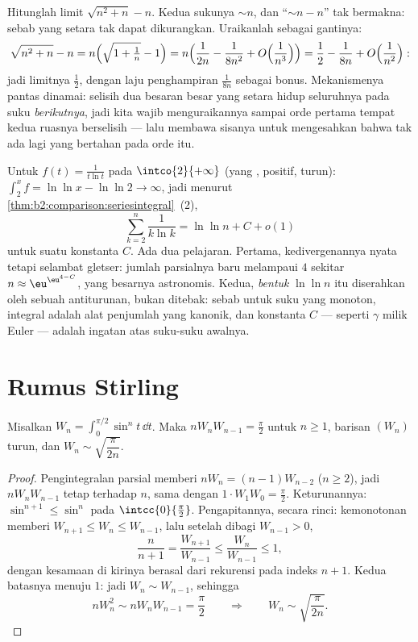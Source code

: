 \begin{example}\label{ex:b2:comparison:cancellation}
Hitunglah limit $\sqrt{n^2 + n} - n$. Kedua sukunya
$\sim n$, dan ``$\sim n - n$'' tak bermakna: sebab yang setara
tak dapat dikurangkan. Uraikanlah sebagai gantinya:
\[
\sqrt{n^2 + n} - n
= n\Bigl(\sqrt{1 + \tfrac1n} - 1\Bigr)
= n\Bigl(\frac{1}{2n} - \frac{1}{8n^2} +
O\Bigl(\frac1{n^3}\Bigr)\Bigr)
= \frac12 - \frac{1}{8n} + O\Bigl(\frac1{n^2}\Bigr) :
\]
jadi limitnya $\frac12$, dengan laju penghampiran $\frac1{8n}$ sebagai
bonus. Mekanismenya pantas dinamai: selisih dua besaran besar
yang setara hidup seluruhnya pada suku \emph{berikutnya},
jadi kita wajib menguraikannya sampai orde pertama tempat kedua
ruasnya berselisih --- lalu membawa sisanya untuk mengesahkan bahwa
tak ada lagi yang bertahan pada orde itu.
\end{example}

\begin{example}\label{ex:b2:comparison:loglog}
Untuk $f(t) = \frac{1}{t\ln t}$ pada $\intco{2}{+\infty}$
(yang , positif, turun): $\int_2^x f = \ln\ln x -
\ln\ln 2 \to \infty$, jadi menurut
\cref{thm:b2:comparison:seriesintegral}~(2),
\[
\sum_{k=2}^{n}\frac{1}{k\ln k} = \ln\ln n + C + o(1)
\]
untuk suatu konstanta $C$. Ada dua pelajaran. Pertama, kedivergenannya
nyata tetapi selambat gletser: jumlah parsialnya baru melampaui $4$
sekitar $n \approx \eu^{\eu^{4 - C}}$, yang besarnya astronomis. Kedua,
\emph{bentuk} $\ln\ln n$ itu diserahkan oleh sebuah antiturunan, bukan
ditebak: sebab untuk suku yang monoton, integral adalah alat penjumlah
yang kanonik, dan konstanta $C$ --- seperti $\gamma$ milik Euler
--- adalah ingatan atas suku-suku awalnya.
\end{example}

\section{Rumus Stirling}

\begin{lemma}\label{lem:b2:comparison:wallis}
Misalkan $W_n = \int_0^{\pi/2} \sin^n t\,\dd t$. Maka $nW_nW_{n-1} =
\frac\pi2$ untuk $n \geq 1$, barisan $(W_n)$ turun, dan $W_n \sim
\sqrt{\dfrac{\pi}{2n}}$.
\end{lemma}

\begin{proof}
Pengintegralan parsial memberi $nW_n = (n-1)W_{n-2}$ ($n \geq 2$), jadi
$nW_nW_{n-1}$ tetap terhadap $n$, sama dengan $1 \cdot W_1 W_0 =
\frac\pi2$. Keturunannya: $\sin^{n+1} \leq \sin^n$ pada
$\intcc{0}{\frac\pi2}$. Pengapitannya, secara rinci: kemonotonan
memberi $W_{n+1} \leq W_n \leq W_{n-1}$, lalu setelah dibagi $W_{n-1}
> 0$,
\[
\frac{n}{n+1} = \frac{W_{n+1}}{W_{n-1}} \leq
\frac{W_n}{W_{n-1}} \leq 1 ,
\]
dengan kesamaan di kirinya berasal dari rekurensi pada indeks $n + 1$.
Kedua batasnya menuju $1$: jadi $W_n \sim W_{n-1}$, sehingga
\[
nW_n^2 \sim nW_nW_{n-1} = \frac\pi2
\qquad\Longrightarrow\qquad
W_n \sim \sqrt{\frac{\pi}{2n}} .
\]
\end{proof}

